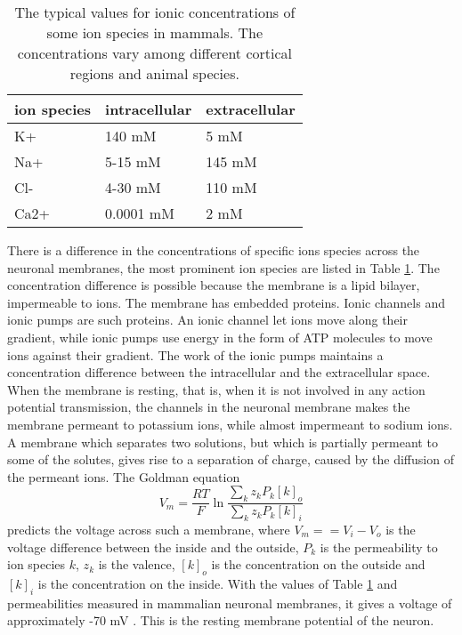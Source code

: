 \documentclass{article}
\begin{document}
\begin{table}[h!]
  \centering
  \caption{The typical values for ionic concentrations of some ion species in mammals\cite{Neuroscience}. The concentrations vary among different cortical regions and animal species.}
  \label{tab:ionic_concentrations}
  \begin{tabular}{l||l|l}
ion species & intracellular & extracellular \\
\hline
K+ & 140 mM & 5  mM\\
Na+ & 5-15 mM & 145 mM\\
Cl- & 4-30 mM& 110 mM\\
Ca2+ & 0.0001 mM & 2 mM  \\
 \end{tabular}
\end{table}
There is a difference in the concentrations of specific ions species across the neuronal membranes, the most prominent ion species are listed in Table \ref{tab:ionic_concentrations}.
The concentration difference is possible because the membrane is a lipid bilayer, impermeable to ions. The membrane has embedded proteins. Ionic channels and ionic pumps are such proteins. An ionic channel let ions move along their gradient, while ionic pumps use energy in the form of ATP molecules to move ions against their gradient. The work of the ionic pumps maintains a concentration difference between the intracellular and the extracellular space. When the membrane is resting, that is, when it is not involved in any action potential transmission, the channels in the neuronal membrane makes the membrane permeant to potassium ions, while almost impermeant to sodium ions. A membrane which separates two solutions, but which is partially permeant to some of the solutes, gives rise to a separation of charge, caused by the diffusion of the permeant ions.  The Goldman equation 
\begin{equation}\label{eq:goldman}
V_m = \frac{RT}{F}\ln \frac{\sum_k z_kP_k[k]_o}{\sum_k z_kP_k[k]_i}
\end{equation}
predicts the voltage across such a membrane, where $V_m == V_i-V_o$ is the voltage difference between the inside and the outside, $P_k$ is the permeability to ion species $k$, $z_k$ is the valence, $[k]_o$ is the concentration on the outside and $[k]_i$ is the concentration on the inside. With the values of Table \ref{tab:ionic_concentrations} and permeabilities measured in mammalian neuronal membranes, it gives a voltage of approximately -70 mV \cite{Neuroscience}. This is the resting membrane potential of the neuron. 
\end{document}
